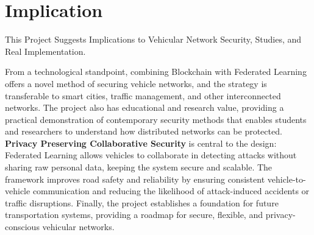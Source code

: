 \documentclass[12pt, a4paper]{report}
\newcommand{\mypar}{\vspace{0.8em}\noindent}
\begin{document}
\mypar
\section{Implication}

This Project Suggests Implications to Vehicular Network Security, Studies, and Real Implementation.

From a technological standpoint, combining Blockchain with Federated Learning offers a novel method of securing vehicle networks, and the strategy is transferable to smart cities, traffic management, and other interconnected networks.
The project also has educational and research value, providing a practical demonstration of contemporary security methods that enables students and researchers to understand how distributed networks can be protected.
\textbf{Privacy Preserving Collaborative Security} is central to the design: Federated Learning allows vehicles to collaborate in detecting attacks without sharing raw personal data, keeping the system secure and scalable.
The framework improves road safety and reliability by ensuring consistent vehicle-to-vehicle communication and reducing the likelihood of attack-induced accidents or traffic disruptions.
Finally, the project establishes a foundation for future transportation systems, providing a roadmap for secure, flexible, and privacy-conscious vehicular networks.



 
\end{document}
